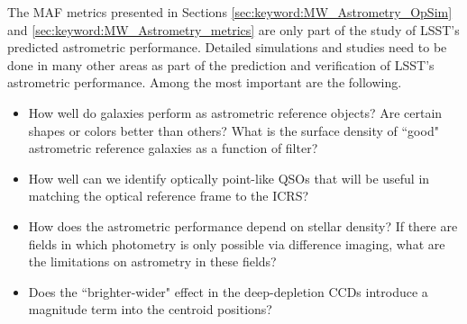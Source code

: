 The MAF metrics presented in Sections \ref{sec:keyword:MW_Astrometry_OpSim} and \ref{sec:keyword:MW_Astrometry_metrics} are only part of the
study of LSST's predicted astrometric performance.  Detailed simulations
and studies need to be done in many other areas as part of the
prediction and verification of LSST's astrometric performance.  Among
the most important are the following.
\begin{itemize}
\item How well do galaxies perform as astrometric reference objects? Are certain shapes or colors better than others? What is the 
surface density of ``good" astrometric reference galaxies as a function of filter? 
\item How well can we identify optically point-like QSOs that will be useful in matching the optical reference frame to the ICRS?
\item How does the astrometric performance depend on stellar density? If there are fields in which photometry is only possible via difference imaging, what are the limitations
on astrometry in these fields?
\item Does the ``brighter-wider" effect in the deep-depletion CCDs introduce a magnitude term into the centroid positions?
\end{itemize}

\navigationbar

